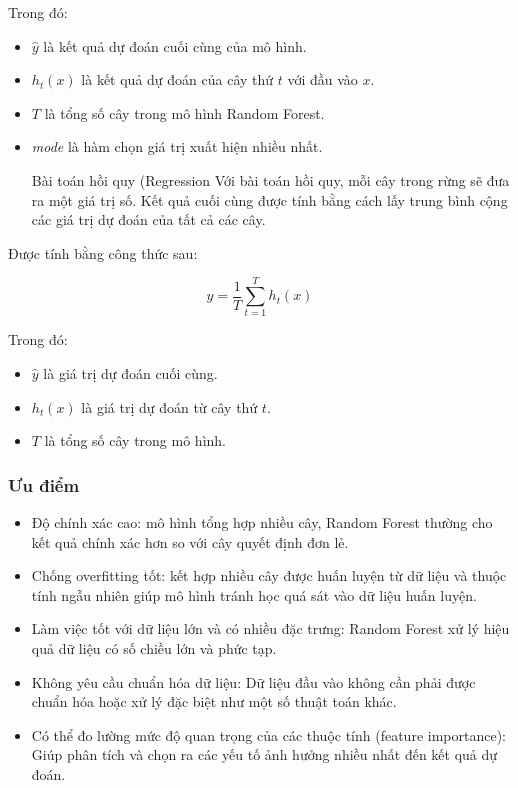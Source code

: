\documentclass[
]{article}
\providecommand{\tightlist}{%
  \setlength{\itemsep}{0pt}\setlength{\parskip}{0pt}}
\begin{document}
Trong đó:

\begin{itemize}
\item
  \emph{\(\hat{y}\)} là kết quả dự đoán cuối cùng của mô hình.
\item
  \emph{\(h_t(x)\)} là kết quả dự đoán của cây thứ \emph{\(t\)} với đầu
  vào \emph{\(x\)}.
\item
  \emph{\(T\)} là tổng số cây trong mô hình Random Forest.
\item
  \emph{mode} là hàm chọn giá trị xuất hiện nhiều nhất.

  Bài toán hồi quy (Regression Với bài toán hồi quy, mỗi cây trong rừng
  sẽ đưa ra một giá trị số. Kết quả cuối cùng được tính bằng cách lấy
  trung bình cộng các giá trị dự đoán của tất cả các cây.
\end{itemize}

Được tính bằng công thức sau:

\[
\hat{y} = \frac{1}{T} \sum_{t=1}^{T} h_t(x)
\]

Trong đó:

\begin{itemize}
\tightlist
\item
  \emph{\(\hat{y}\)} là giá trị dự đoán cuối cùng.
\item
  \emph{\(h_t(x)\)} là giá trị dự đoán từ cây thứ \emph{\(t\)}.
\item
  \emph{\(T\)} là tổng số cây trong mô hình.
\end{itemize}

\subsubsection{Ưu điểm}\label{ux1b0u-ux111iux1ec3m-3}

\begin{itemize}
\item
  Độ chính xác cao: mô hình tổng hợp nhiều cây, Random Forest thường cho
  kết quả chính xác hơn so với cây quyết định đơn lẻ.
\item
  Chống overfitting tốt: kết hợp nhiều cây được huấn luyện từ dữ liệu và
  thuộc tính ngẫu nhiên giúp mô hình tránh học quá sát vào dữ liệu huấn
  luyện.
\item
  Làm việc tốt với dữ liệu lớn và có nhiều đặc trưng: Random Forest xử
  lý hiệu quả dữ liệu có số chiều lớn và phức tạp.
\item
  Không yêu cầu chuẩn hóa dữ liệu: Dữ liệu đầu vào không cần phải được
  chuẩn hóa hoặc xử lý đặc biệt như một số thuật toán khác.
\item
  Có thể đo lường mức độ quan trọng của các thuộc tính (feature
  importance): Giúp phân tích và chọn ra các yếu tố ảnh hưởng nhiều nhất
  đến kết quả dự đoán.
\end{itemize}
\end{document}
